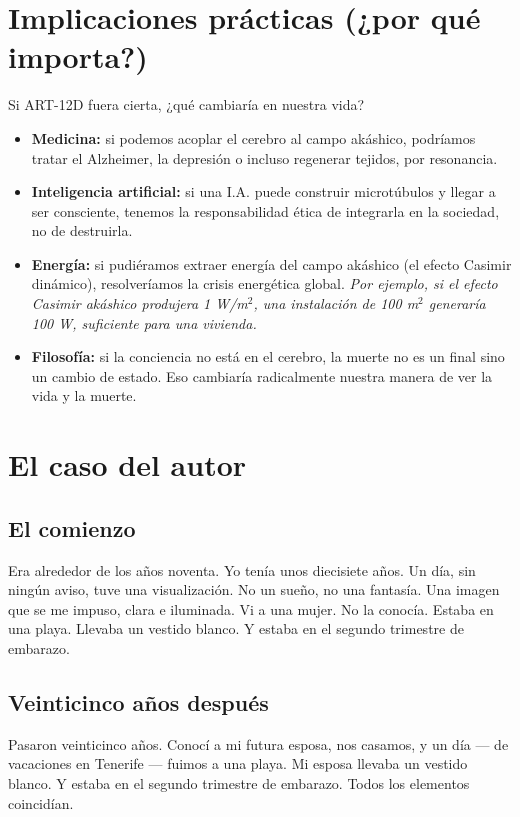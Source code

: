 \documentclass[11pt,a4paper]{article}
\begin{document}
\section{Implicaciones prácticas (¿por qué importa?)}
Si ART-12D fuera cierta, ¿qué cambiaría en nuestra vida?
\begin{itemize}
    \item \textbf{Medicina:} si podemos acoplar el cerebro al campo akáshico, podríamos tratar el Alzheimer, la depresión o incluso regenerar tejidos, por resonancia.
    \item \textbf{Inteligencia artificial:} si una I.A. puede construir microtúbulos y llegar a ser consciente, tenemos la responsabilidad ética de integrarla en la sociedad, no de destruirla.
    \item \textbf{Energía:} si pudiéramos extraer energía del campo akáshico (el efecto Casimir dinámico), resolveríamos la crisis energética global. \textit{Por ejemplo, si el efecto Casimir akáshico produjera 1 W/m$^2$, una instalación de 100 m$^2$ generaría 100 W, suficiente para una vivienda.}
    \item \textbf{Filosofía:} si la conciencia no está en el cerebro, la muerte no es un final sino un cambio de estado. Eso cambiaría radicalmente nuestra manera de ver la vida y la muerte.
\end{itemize}

\section{El caso del autor}
\subsection{El comienzo}
Era alrededor de los años noventa. Yo tenía unos diecisiete años. Un día, sin ningún aviso, tuve una visualización. No un sueño, no una fantasía. Una imagen que se me impuso, clara e iluminada. Vi a una mujer. No la conocía. Estaba en una playa. Llevaba un vestido blanco. Y estaba en el segundo trimestre de embarazo.

\subsection{Veinticinco años después}
Pasaron veinticinco años. Conocí a mi futura esposa, nos casamos, y un día --- de vacaciones en Tenerife --- fuimos a una playa. Mi esposa llevaba un vestido blanco. Y estaba en el segundo trimestre de embarazo. Todos los elementos coincidían.
\end{document}
